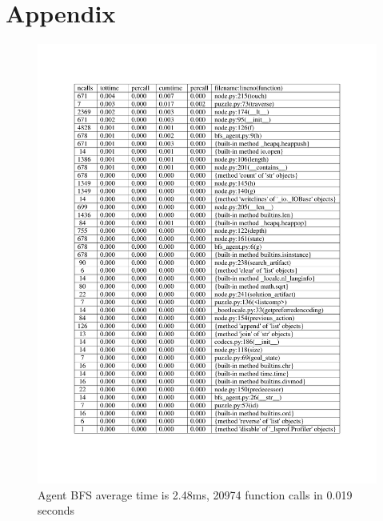 \section{Appendix}

\begin{figure}[H]
\includegraphics[width=1\linewidth]{assets/Assignment 1 profiling bfs.pdf}
\caption{Agent BFS average time is 2.48ms, 20974 function calls in 0.019 seconds} \label{bfs profiling}
\end{figure}

